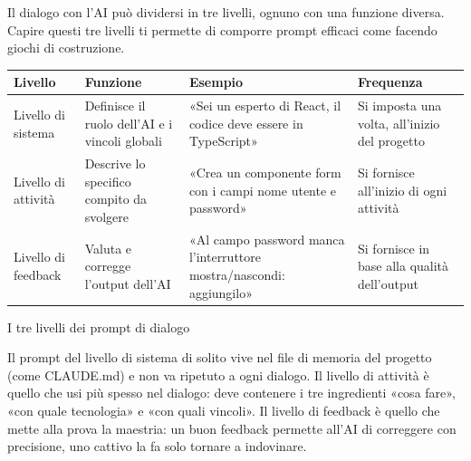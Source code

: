 


Il dialogo con l'AI può dividersi in tre livelli, ognuno con una funzione diversa. Capire questi tre livelli ti permette di comporre prompt efficaci come facendo giochi di costruzione.

\begin{center}
\begin{tabularx}{\linewidth}{|X|X|X|X|}
\hline
\textbf{Livello} & \textbf{Funzione} & \textbf{Esempio} & \textbf{Frequenza} \tabularnewline
\hline
Livello di sistema & Definisce il ruolo dell'AI e i vincoli globali & «Sei un esperto di React, il codice deve essere in TypeScript» & Si imposta una volta, all'inizio del progetto \tabularnewline
Livello di attività & Descrive lo specifico compito da svolgere & «Crea un componente form con i campi nome utente e password» & Si fornisce all'inizio di ogni attività \tabularnewline
Livello di feedback & Valuta e corregge l'output dell'AI & «Al campo password manca l'interruttore mostra/nascondi: aggiungilo» & Si fornisce in base alla qualità dell'output \tabularnewline
\hline
\end{tabularx}
\end{center}

\begin{center}\small\color{gray}I tre livelli dei prompt di dialogo\end{center}

Il prompt del livello di sistema di solito vive nel file di memoria del progetto (come CLAUDE.md) e non va ripetuto a ogni dialogo. Il livello di attività è quello che usi più spesso nel dialogo: deve contenere i tre ingredienti «cosa fare», «con quale tecnologia» e «con quali vincoli». Il livello di feedback è quello che mette alla prova la maestria: un buon feedback permette all'AI di correggere con precisione, uno cattivo la fa solo tornare a indovinare.

